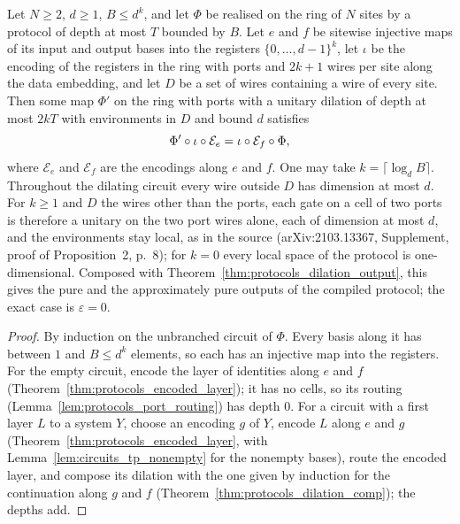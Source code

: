 \begin{theorem}
    \label{thm:protocols_port_ring}
    \leanok
    Let $N\ge2$, $d\ge1$, $B\le d^k$, and let $\Phi$ be realised on the ring of $N$ sites by a
    protocol of depth at most $T$ bounded by $B$. Let $e$ and $f$ be sitewise injective maps of
    its input and output bases into the registers $\{0,\dots,d-1\}^k$, let $\iota$ be the
    encoding of the registers in the ring with ports and $2k+1$ wires per site along the data
    embedding, and let $D$ be a set of wires containing a wire of every site. Then some map
    $\Phi'$ on the ring with ports with a unitary dilation of depth at most $2kT$ with
    environments in $D$ and bound $d$ satisfies
    \begin{equation}
        \Phi'\circ\iota\circ\mathcal E_e=\iota\circ\mathcal E_f\circ\Phi,
        \notag
    \end{equation}
    where $\mathcal E_e$ and $\mathcal E_f$ are the encodings along $e$ and $f$. One may take
    $k=\lceil\log_dB\rceil$. Throughout the dilating circuit every wire outside $D$ has
    dimension at most $d$. For $k\ge1$ and $D$ the wires other than the ports, each gate on a
    cell of two ports is therefore a unitary on the two port wires alone, each of dimension at
    most $d$, and the
    environments stay local, as in the source
    (arXiv:2103.13367, Supplement, proof of Proposition~2, p.~8); for $k=0$ every local space
    of the protocol is one-dimensional. Composed with
    Theorem~\ref{thm:protocols_dilation_output}, this gives the pure and the approximately pure
    outputs of the compiled protocol; the exact case is $\varepsilon=0$.
\end{theorem}
\begin{proof}\leanok
    By induction on the unbranched circuit of $\Phi$. Every basis along it has between $1$ and
    $B\le d^k$ elements, so each has an injective map into the registers. For the empty
    circuit, encode the layer of identities along $e$ and $f$
    (Theorem~\ref{thm:protocols_encoded_layer}); it has no cells, so its routing
    (Lemma~\ref{lem:protocols_port_routing}) has depth $0$. For a circuit with a first layer
    $L$ to a system $Y$, choose an encoding $g$ of $Y$, encode $L$ along $e$ and $g$
    (Theorem~\ref{thm:protocols_encoded_layer}, with Lemma~\ref{lem:circuits_tp_nonempty} for
    the nonempty bases), route the encoded layer, and compose its dilation with the one given by
    induction for the continuation along $g$ and $f$
    (Theorem~\ref{thm:protocols_dilation_comp}); the depths add.
\end{proof}


